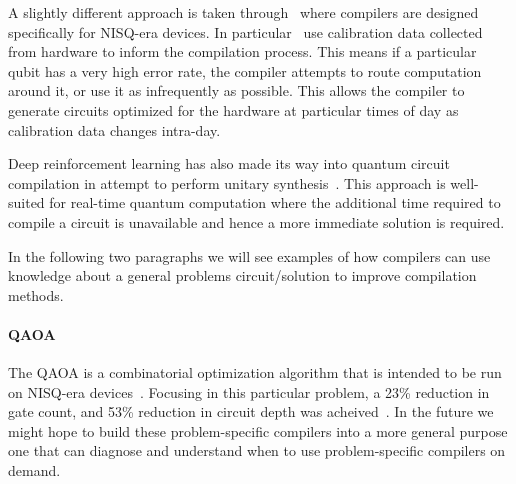 A slightly different approach is taken through~\cite{nisq-comp,nisq-comp2,nisq-comp3} where compilers are designed specifically for \ac{NISQ}-era devices.
In particular~\cite{nisq-comp2,nisq-comp3} use calibration data collected from hardware to inform the compilation process.
This means if a particular qubit has a very high error rate, the compiler attempts to route computation around it, or use it as infrequently as possible.
This allows the compiler to generate circuits optimized for the hardware at particular times of day as calibration data changes intra-day.

Deep reinforcement learning has also made its way into quantum circuit compilation in attempt to perform unitary synthesis~\cite{deepcompile}.
This approach is well-suited for real-time quantum computation where the additional time required to compile a circuit is unavailable and hence a more immediate solution is required.

In the following two paragraphs we will see examples of how compilers can use knowledge about a general problems circuit/solution to improve compilation methods.

\paragraph{QAOA}
The \ac{QAOA} is a combinatorial optimization algorithm that is intended to be run on \ac{NISQ}-era devices~\cite{qaoa}.
Focusing in this particular problem, a 23\% reduction in gate count, and 53\% reduction in circuit depth was acheived~\cite{qaoa-compiler}.
In the future we might hope to build these problem-specific compilers into a more general purpose one that can diagnose and understand when to use problem-specific compilers on demand.

